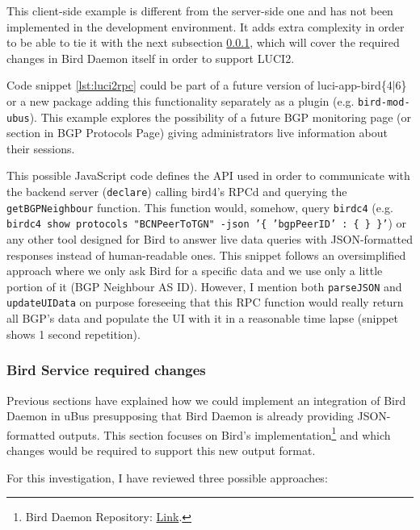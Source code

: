 This client-side example is different from the server-side one and has not been implemented in the development environment. It adds extra complexity in order to be able to tie it with the next subsection \ref{sub:sub:birdex}, which will cover the required changes in Bird Daemon itself in order to support LUCI2.

Code snippet \ref{lst:luci2rpc} could be part of a future version of luci-app-bird\{4|6\} or a new package adding this functionality separately as a plugin (e.g. \texttt{bird-mod-ubus}). This example explores the possibility of a future BGP monitoring page (or section in BGP Protocols Page) giving administrators live information about their sessions.

 

This possible JavaScript code defines the API used in order to communicate with the backend server (\texttt{declare}) calling bird4's RPCd and querying the \texttt{getBGPNeighbour} function. This function would, somehow, query \texttt{birdc4} (e.g. \texttt{birdc4 show protocols "BCNPeerToTGN" -json '\{ 'bgpPeerID' : \{ \} \}'}) or any other tool designed for Bird to answer live data queries with JSON-formatted responses instead of human-readable ones.
This snippet follows an oversimplified approach where we only ask Bird for a specific data and we use only a little portion of it (BGP Neighbour AS ID). However, I mention both \texttt{parseJSON} and \texttt{updateUIData} on purpose foreseeing that this RPC function would really return all BGP's data and populate the UI with it in a reasonable time lapse (snippet shows 1 second repetition).

\subsubsection{Bird Service required changes}
\label{sub:sub:birdex}
Previous sections have explained how we could implement an integration of Bird Daemon in uBus presupposing that Bird Daemon is already providing JSON-formatted outputs.
This section focuses on Bird's implementation\footnote{Bird Daemon Repository: \href{https://gitlab.labs.nic.cz/labs/bird}{Link}.} and which changes would be required to support this new output format.

For this investigation, I have reviewed three possible approaches:

